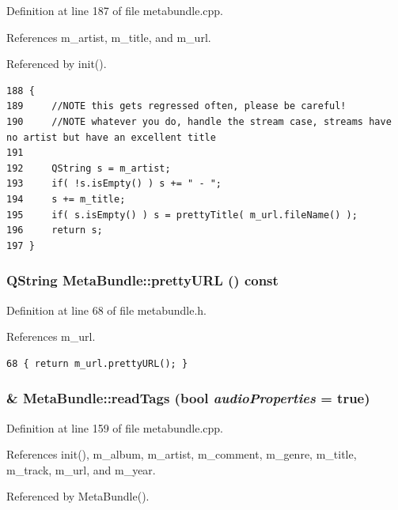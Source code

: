 Definition at line 187 of file metabundle.cpp.

References m\_\-artist, m\_\-title, and m\_\-url.

Referenced by init().



\footnotesize\begin{verbatim}188 {
189     //NOTE this gets regressed often, please be careful!
190     //NOTE whatever you do, handle the stream case, streams have no artist but have an excellent title
191 
192     QString s = m_artist;
193     if( !s.isEmpty() ) s += " - ";
194     s += m_title;
195     if( s.isEmpty() ) s = prettyTitle( m_url.fileName() );
196     return s;
197 }
\end{verbatim}\normalsize 
{}
\subsubsection{\setlength{\rightskip}{0pt plus 5cm}QString Meta\-Bundle::pretty\-URL () const\hspace{0.3cm}{\tt  [inline]}}\label{classMetaBundle_MetaBundlea18}




Definition at line 68 of file metabundle.h.

References m\_\-url.



\footnotesize\begin{verbatim}68 { return m_url.prettyURL(); }
\end{verbatim}\normalsize 
{}
\subsubsection{ \& Meta\-Bundle::read\-Tags (bool {\em audio\-Properties} = true)}\label{classMetaBundle_MetaBundlea4}




Definition at line 159 of file metabundle.cpp.

References init(), m\_\-album, m\_\-artist, m\_\-comment, m\_\-genre, m\_\-title, m\_\-track, m\_\-url, and m\_\-year.

Referenced by Meta\-Bundle().



